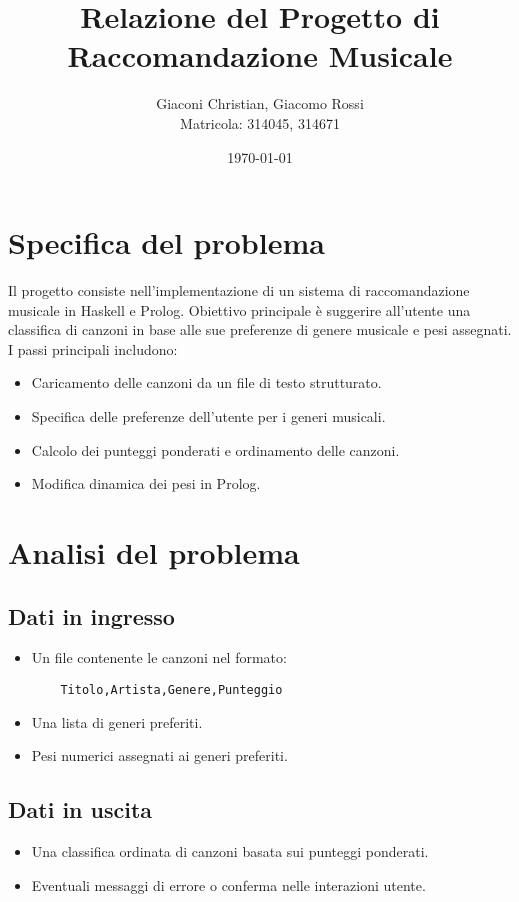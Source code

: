 \documentclass[a4paper,11pt]{article}
\title{\textbf{Relazione del Progetto di Raccomandazione Musicale}}
\author{Giaconi Christian, Giacomo Rossi\\Matricola: 314045, 314671}
\date{\today}
\begin{document}
\maketitle

\tableofcontents

\section{Specifica del problema}
Il progetto consiste nell'implementazione di un sistema di raccomandazione musicale in Haskell e Prolog. Obiettivo principale è suggerire all'utente una classifica di canzoni in base alle sue preferenze di genere musicale e pesi assegnati. I passi principali includono:
\begin{itemize}
    \item Caricamento delle canzoni da un file di testo strutturato.
    \item Specifica delle preferenze dell'utente per i generi musicali.
    \item Calcolo dei punteggi ponderati e ordinamento delle canzoni.
    \item Modifica dinamica dei pesi in Prolog.
\end{itemize}

\section{Analisi del problema}
\subsection{Dati in ingresso}
\begin{itemize}
    \item Un file contenente le canzoni nel formato:
    \begin{verbatim}
    Titolo,Artista,Genere,Punteggio
    \end{verbatim}
    \item Una lista di generi preferiti.
    \item Pesi numerici assegnati ai generi preferiti.
\end{itemize}

\subsection{Dati in uscita}
\begin{itemize}
    \item Una classifica ordinata di canzoni basata sui punteggi ponderati.
    \item Eventuali messaggi di errore o conferma nelle interazioni utente.
\end{itemize}
\end{document}
